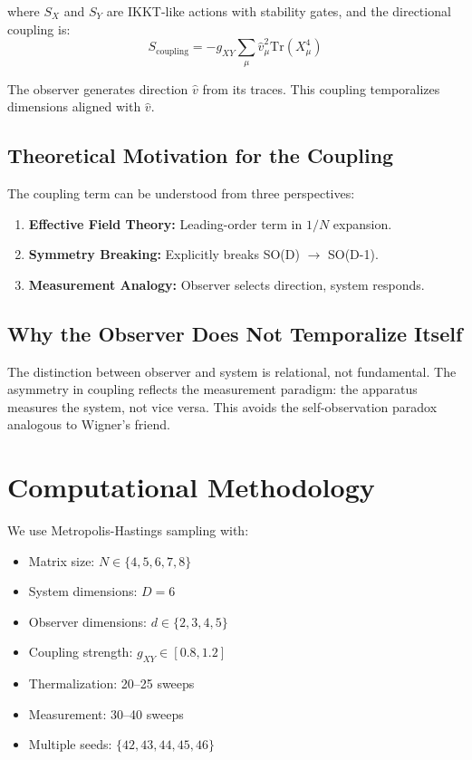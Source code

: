 \documentclass[12pt,a4paper]{article}
\begin{document}
where $S_X$ and $S_Y$ are IKKT-like actions with stability gates, and the 
directional coupling is:
\begin{equation}
S_{\text{coupling}} = -g_{XY} \sum_\mu \hat{v}_\mu^2 \text{Tr}(X_\mu^4)
\end{equation}

The observer generates direction $\hat{v}$ from its traces. This coupling 
temporalizes dimensions aligned with $\hat{v}$.

\subsection{Theoretical Motivation for the Coupling}

The coupling term can be understood from three perspectives:

\begin{enumerate}[leftmargin=*]
\item \textbf{Effective Field Theory:} Leading-order term in $1/N$ expansion.
\item \textbf{Symmetry Breaking:} Explicitly breaks SO(D) $\rightarrow$ SO(D-1).
\item \textbf{Measurement Analogy:} Observer selects direction, system responds.
\end{enumerate}

\subsection{Why the Observer Does Not Temporalize Itself}

The distinction between observer and system is relational, not fundamental. 
The asymmetry in coupling reflects the measurement paradigm: the apparatus 
measures the system, not vice versa. This avoids the self-observation paradox 
analogous to Wigner's friend.

\section{Computational Methodology}\label{sec:method}

We use Metropolis-Hastings sampling with:
\begin{itemize}
\item Matrix size: $N \in \{4, 5, 6, 7, 8\}$
\item System dimensions: $D = 6$
\item Observer dimensions: $d \in \{2, 3, 4, 5\}$
\item Coupling strength: $g_{XY} \in [0.8, 1.2]$
\item Thermalization: 20--25 sweeps
\item Measurement: 30--40 sweeps
\item Multiple seeds: $\{42, 43, 44, 45, 46\}$
\end{itemize}
\end{document}
